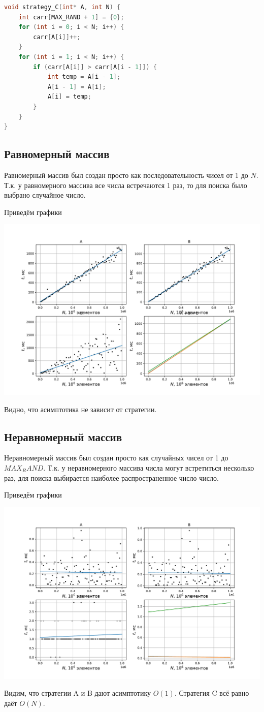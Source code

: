 \documentclass[a4paper,12pt]{article}
\begin{document}
\begin{lstlisting}[language=C++]
void strategy_C(int* A, int N) {
	int carr[MAX_RAND + 1] = {0};
	for (int i = 0; i < N; i++) {
		carr[A[i]]++;
	}
	for (int i = 1; i < N; i++) {
		if (carr[A[i]] > carr[A[i - 1]]) {
			int temp = A[i - 1];
			A[i - 1] = A[i];
			A[i] = temp;
		}
	}
}
\end{lstlisting}

\subsection*{Равномерный массив}
Равномерный массив был создан просто как последовательность чисел от 1 до $N$. Т.к. у равномерного массива все числа встречаются 1 раз, то для поиска было выбрано случайное число.

Приведём графики

\begin{center}
\includegraphics[scale=0.5]{Figure_5.pdf}
\end{center}

Видно, что асимптотика не зависит от стратегии.

\subsection*{Неравномерный массив}
Неравномерный массив был создан просто как случайных чисел от 1 до $MAX_RAND$. Т.к. у неравномерного массива числа могут встретиться несколько раз, для поиска выбирается наиболее распространенное число число.

Приведём графики

\begin{center}
\includegraphics[scale=0.5]{Figure_6.pdf}
\end{center}

Видим, что стратегии A и B дают асимптотику $O(1)$. Стратегия C всё равно даёт $O(N)$.
\end{document}
